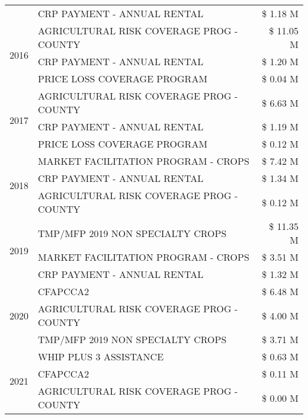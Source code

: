 \begin{tabular}{llr}
 & CRP PAYMENT - ANNUAL RENTAL & \$ 1.18 M \\
\cline{1-3}
\multirow[t]{3}{*}{2016} & AGRICULTURAL RISK COVERAGE PROG - COUNTY & \$ 11.05 M \\
 & CRP PAYMENT - ANNUAL RENTAL & \$ 1.20 M \\
 & PRICE LOSS COVERAGE PROGRAM & \$ 0.04 M \\
\cline{1-3}
\multirow[t]{3}{*}{2017} & AGRICULTURAL RISK COVERAGE PROG - COUNTY & \$ 6.63 M \\
 & CRP PAYMENT - ANNUAL RENTAL & \$ 1.19 M \\
 & PRICE LOSS COVERAGE PROGRAM & \$ 0.12 M \\
\cline{1-3}
\multirow[t]{3}{*}{2018} & MARKET FACILITATION PROGRAM - CROPS & \$ 7.42 M \\
 & CRP PAYMENT - ANNUAL RENTAL & \$ 1.34 M \\
 & AGRICULTURAL RISK COVERAGE PROG - COUNTY & \$ 0.12 M \\
\cline{1-3}
\multirow[t]{3}{*}{2019} & TMP/MFP 2019 NON SPECIALTY CROPS & \$ 11.35 M \\
 & MARKET FACILITATION PROGRAM - CROPS & \$ 3.51 M \\
 & CRP PAYMENT - ANNUAL RENTAL & \$ 1.32 M \\
\cline{1-3}
\multirow[t]{3}{*}{2020} & CFAPCCA2 & \$ 6.48 M \\
 & AGRICULTURAL RISK COVERAGE PROG - COUNTY & \$ 4.00 M \\
 & TMP/MFP 2019 NON SPECIALTY CROPS & \$ 3.71 M \\
\cline{1-3}
\multirow[t]{3}{*}{2021} & WHIP PLUS 3 ASSISTANCE & \$ 0.63 M \\
 & CFAPCCA2 & \$ 0.11 M \\
 & AGRICULTURAL RISK COVERAGE PROG - COUNTY & \$ 0.00 M \\
\cline{1-3}
\bottomrule
\end{tabular}
